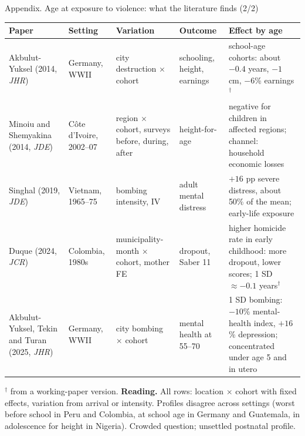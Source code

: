 \documentclass[aspectratio=169,11pt]{beamer}
\begin{document}
\begin{frame}{Appendix. Age at exposure to violence: what the literature finds (2/2)}
\scriptsize
\setlength{\tabcolsep}{4pt}\renewcommand{\arraystretch}{1.0}
\begin{tabular}{@{}p{2.8cm}p{1.9cm}p{2.2cm}p{1.8cm}p{3.7cm}@{}}
\toprule
\textbf{Paper} & \textbf{Setting} & \textbf{Variation} & \textbf{Outcome} & \textbf{Effect by age} \\
\midrule
Akbulut-Yuksel (2014, \emph{JHR}) & Germany, WWII & city destruction $\times$ cohort & schooling, height, earnings & school-age cohorts: about $-0.4$ years, $-1$ cm, $-6$\% earnings$^{\dagger}$ \\
Minoiu and Shemyakina (2014, \emph{JDE}) & Côte d'Ivoire, 2002--07 & region $\times$ cohort, surveys before, during, after & height-for-age & negative for children in affected regions; channel: household economic losses \\
Singhal (2019, \emph{JDE}) & Vietnam, 1965--75 & bombing intensity, IV & adult mental distress & $+16$ pp severe distress, about 50\% of the mean; early-life exposure \\
Duque (2024, \emph{JCR}) & Colombia, 1980s & municipality-month $\times$ cohort, mother FE & dropout, Saber 11 & higher homicide rate in early childhood: more dropout, lower scores; 1 SD $\approx -0.1$ years$^{\dagger}$ \\
Akbulut-Yuksel, Tekin and Turan (2025, \emph{JHR}) & Germany, WWII & city bombing $\times$ cohort & mental health at 55--70 & 1 SD bombing: $-10$\% mental-health index, $+16$\% depression; concentrated under age 5 and in utero \\
\bottomrule
\end{tabular}
\vspace{0.4em}

$^{\dagger}$ from a working-paper version. \textbf{Reading.} All rows: location $\times$ cohort with fixed effects, variation from arrival or intensity. Profiles disagree across settings (worst before school in Peru and Colombia, at school age in Germany and Guatemala, in adolescence for height in Nigeria). Crowded question; unsettled postnatal profile.
\end{frame}
\end{document}

